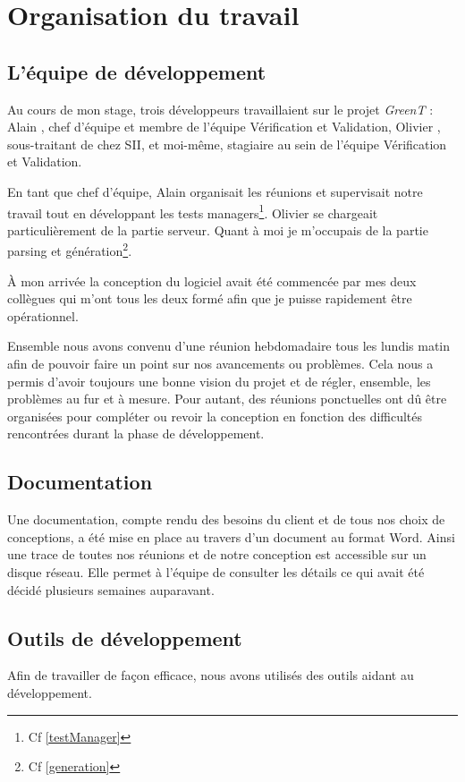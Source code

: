 \chapter{Organisation du travail}
\section{L'équipe de développement}
Au cours de mon stage, trois développeurs travaillaient sur le projet \textit{GreenT} : Alain , chef d’équipe et membre de l’équipe Vérification et Validation, Olivier , sous-traitant de chez SII, et moi-même, stagiaire au sein de l’équipe Vérification et Validation.

En tant que chef d’équipe, Alain  organisait les réunions et supervisait notre travail tout en développant les tests managers\footnote{Cf \ref{testManager}}. Olivier  se chargeait particulièrement de la partie serveur. Quant à moi je m’occupais de la partie parsing et génération\footnote{Cf \ref{generation}}.

À mon arrivée la conception du logiciel avait été commencée par mes deux collègues qui m’ont tous les deux formé afin que je puisse rapidement être opérationnel.

Ensemble nous avons convenu d’une réunion hebdomadaire tous les lundis matin afin de pouvoir faire un point sur nos avancements ou problèmes. Cela nous a permis d’avoir toujours une bonne vision du projet et de régler, ensemble, les problèmes au fur et à mesure. Pour autant, des réunions ponctuelles ont dû être organisées pour compléter ou revoir la conception en fonction des difficultés rencontrées durant la phase de développement.

\section{Documentation}
Une documentation, compte rendu des besoins du client et de tous nos choix de conceptions, a été mise en place au travers d’un document au format Word. Ainsi une trace de toutes nos réunions et de notre conception est accessible sur un disque réseau. Elle permet à l’équipe de consulter les détails ce qui avait été décidé plusieurs semaines auparavant.

\section{Outils de développement}
Afin de travailler de façon efficace, nous avons utilisés des outils aidant au développement.

